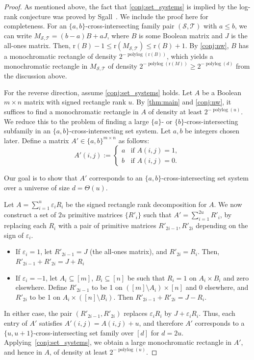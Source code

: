 \documentclass[11pt]{article}
\theoremstyle{plain}
\theoremstyle{remark}
\def\r{{\mathrm{r}}}
\newcommand{\eps}{\varepsilon}
\DeclareMathOperator{\polylog}{polylog}
\begin{document}
\begin{proof}
	As mentioned above, the fact that \cref{conj:set_systems} is implied by the log-rank conjecture was proved by Sgall~\cite{sgall1999}. We include the proof here for completeness. For an $\{a,b\}$-cross-intersecting family pair $(\mathcal{S}, \mathcal{T})$ with $a \leq b$, we can write $M_{\mathcal{S}, \mathcal{T}} = (b-a) B + a J$, where $B$ is  some Boolean matrix and $J$ is the all-ones matrix. Then, $\r(B) - 1 \leq \r(M_{\mathcal{S}, \mathcal{T}}) \leq \r(B) + 1$. By \cref{conj:nw}, $B$ has a monochromatic rectangle of density $2^{-{\polylog}(\r(B))}$, which yields a monochromatic rectangle in $M_{\mathcal{S}, \mathcal{T}}$ of density $2^{-{\polylog}(\r(M))} \geq 2^{-\polylog(d)}$ from the discussion above.
	
	
	For the reverse direction, assume \cref{conj:set_systems} holds. Let $A$ be a Boolean $m \times n$ matrix with signed rectangle rank $u$. By \cref{thm:main} and \cref{conj:nw}, it suffices to find a monochromatic rectangle in $A$ of density at least $2^{-\polylog(u)}$.  We reduce this to the problem of finding a large $\{a\}$- or $\{b\}$-cross-intersecting subfamily in an $\{a,b\}$-cross-intersecting set system. Let $a,b$ be integers chosen later. Define a matrix $A' \in \{a,b\}^{m \times n}$ as follows:
	\[
	A'(i,j) := \begin{cases}
		a & \text{if } A(i,j) = 1, \\
		b & \text{if } A(i,j) = 0.
	\end{cases}
	\]
	
	Our goal is to show that $A'$ corresponds to an $\{a,b\}$-cross-intersecting set system over a universe of size $d = \Theta(u)$. 
	
	Let $A= \sum_{i=1}^u \eps_i R_i$ be the signed rectangle rank decomposition for $A$. We now construct a set of $2u$ primitive matrices $\{R'_i\}$ such that $A' = \sum_{i=1}^{2u} R'_i$, by replacing each $R_i$ with a pair of primitive matrices $R'_{2i-1}, R'_{2i}$ depending on the sign of $\eps_i$. 
	
	\begin{itemize}
		\item If $\eps_i = 1$, let $R'_{2i-1}=J$  (the all-ones matrix), and $R'_{2i} = R_i$. Then, $R'_{2i-1} + R'_{2i} = J + R_i$
		\item If \(\varepsilon_i = -1\), let \(A_i \subseteq [m]\), \(B_i \subseteq [n]\) be such that \(R_i = 1\) on \(A_i \times B_i\) and zero elsewhere.  
		Define \(R'_{2i-1}\) to be 1 on \(([m]\setminus A_i) \times [n]\) and 0 elsewhere, and \(R'_{2i}\) to be 1 on \(A_i \times ([n]\setminus B_i)\). Then \(R'_{2i-1} + R'_{2i} = J - R_i\). 
	\end{itemize}
	
	In either case, the pair \((R'_{2i-1}, R'_{2i})\) replaces \(\varepsilon_i R_i\) by \(J + \varepsilon_i R_i\). Thus, each entry of $A'$ satisfies $A'(i, j) = A(i, j) + u$, and therefore $A'$ corresponds to a $\{u, u+1\}$-cross-intersecting set family over $[d]$ for $d = 2u$. Applying~\cref{conj:set_systems}, we obtain a large monochromatic rectangle in $A'$, and hence in $A$, of density at least $2^{-\polylog(u)}$. 
\end{proof}
\end{document}
